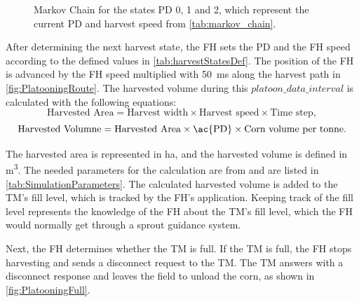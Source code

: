 \begin{figure}[H]
\centering
{}
\caption{Markov Chain for the states \acf{PD} 0, 1 and 2, which represent the current \ac{PD} and
harvest speed from \autoref{tab:markov_chain}.}
\label{fig:MarkovChain}
\end{figure}

After determining the next harvest state, the \ac{FH} sets the \ac{PD} and the \ac{FH} speed according to the defined values in
\autoref{tab:harvestStatesDef}.
The position of the \ac{FH} is advanced by the \ac{FH} speed multiplied with \SI{50}{\milli\second} along the
harvest path in \autoref{fig:PlatooningRoute}.
The harvested volume during this $platoon\_data\_interval$ is calculated with the following
equations:
\begin{equation}
   \label{eq:AreaCalculation}
   \text{Harvested Area} =
      \text{Harvest width} \times \text{Harvest speed} \times \text{Time step}
   ,
\end{equation}
\begin{equation}
   \label{eq:VolumneCalculation}
   \text{Harvested Volumne} =
   \text{Harvested Area} \times \text{\ac{PD}} \times \text{Corn volume per tonne}.
\end{equation}

The harvested area is represented in \si{\hectare}, and
the harvested volume is defined in \si{\cubic\metre}.
The needed parameters for the calculation are from \cite{faustzahlen2018} and are listed in \autoref{tab:SimulationParameters}.
The calculated harvested volume is added to the \ac{TM}'s fill level, which is tracked by the \ac{FH}'s application.
Keeping track of the fill level represents the knowledge of the \ac{FH} about the \ac{TM}'s fill level, which the \ac{FH} would
normally get through a sprout guidance system.

Next, the \ac{FH} determines whether the \ac{TM} is full.
If the \ac{TM} is full, the \ac{FH} stops harvesting and sends a disconnect request to the \ac{TM}.
The \ac{TM} answers with a disconnect response and leaves the field to unload the corn, as shown in \autoref{fig:PlatooningFull}.



